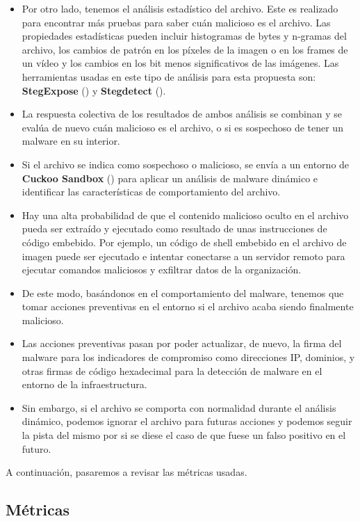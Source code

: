 \begin{itemize}
\item Por otro lado, tenemos el análisis estadístico del archivo. Este es realizado para encontrar más pruebas para saber cuán malicioso es el archivo. Las propiedades estadísticas pueden incluir histogramas de bytes y n-gramas del archivo, los cambios de patrón en los píxeles de la imagen o en los frames de un vídeo y los cambios en los bit menos significativos de las imágenes. Las herramientas usadas en este tipo de análisis para esta propuesta son: \textbf{StegExpose} (\cite{stegexpose}) y \textbf{Stegdetect} (\cite{stegdetect}). %
\item La respuesta colectiva de los resultados de ambos análisis se combinan y se evalúa de nuevo cuán malicioso es el archivo, o si es sospechoso de tener un malware en su interior.
\item Si el archivo se indica como sospechoso o malicioso, se envía a un entorno de \textbf{Cuckoo Sandbox} (\cite{cuckoo-sandbox}) para aplicar un análisis de malware dinámico e identificar las características de comportamiento del archivo.%
\item Hay una alta probabilidad de que el contenido malicioso oculto en el archivo pueda ser extraído y ejecutado como resultado de unas instrucciones de código embebido. Por ejemplo, un código de shell embebido en el archivo de imagen puede ser ejecutado e intentar conectarse a un servidor remoto para ejecutar comandos maliciosos y exfiltrar datos de la organización.
\item De este modo, basándonos en el comportamiento del malware, tenemos que tomar acciones preventivas en el entorno si el archivo acaba siendo finalmente malicioso.
\item Las acciones preventivas pasan por poder actualizar, de nuevo, la firma del malware para los indicadores de compromiso como direcciones IP, dominios, y otras firmas de código hexadecimal para la detección de malware en el entorno de la infraestructura.
\item Sin embargo, si el archivo se comporta con normalidad durante el análisis dinámico, podemos ignorar el archivo para futuras acciones y podemos seguir la pista del mismo por si se diese el caso de que fuese un falso positivo en el futuro.
\end{itemize}

A continuación, pasaremos a revisar las métricas usadas.

\subsection{Métricas}

